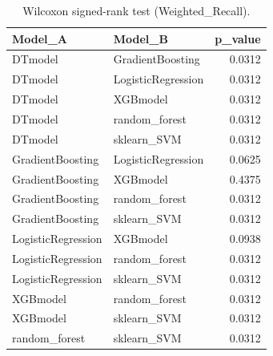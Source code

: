 \begin{table}[t]
\centering
\begin{tabular}{llr}
\toprule
Model_A & Model_B & p_value \\
\midrule
DTmodel & GradientBoosting & 0.0312 \\
DTmodel & LogisticRegression & 0.0312 \\
DTmodel & XGBmodel & 0.0312 \\
DTmodel & random_forest & 0.0312 \\
DTmodel & sklearn_SVM & 0.0312 \\
GradientBoosting & LogisticRegression & 0.0625 \\
GradientBoosting & XGBmodel & 0.4375 \\
GradientBoosting & random_forest & 0.0312 \\
GradientBoosting & sklearn_SVM & 0.0312 \\
LogisticRegression & XGBmodel & 0.0938 \\
LogisticRegression & random_forest & 0.0312 \\
LogisticRegression & sklearn_SVM & 0.0312 \\
XGBmodel & random_forest & 0.0312 \\
XGBmodel & sklearn_SVM & 0.0312 \\
random_forest & sklearn_SVM & 0.0312 \\
\bottomrule
\end{tabular}
\caption{Wilcoxon signed-rank test (Weighted_Recall).}
\label{tab:wilcoxon_Weighted_Recall}
\end{table}